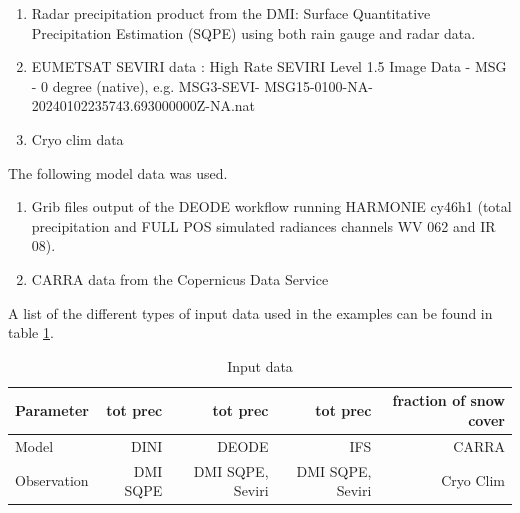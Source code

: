 \documentclass[11pt,a4paper]{article}
\begin{document}
\begin{enumerate}
\item Radar precipitation product from the DMI: Surface Quantitative Precipitation
Estimation (SQPE) using both rain gauge and radar data.

\item EUMETSAT SEVIRI data \cite{seviri}: High Rate SEVIRI
Level 1.5 Image Data - MSG - 0 degree (native), e.g. MSG3-SEVI-
MSG15-0100-NA-20240102235743.693000000Z-NA.nat
\item Cryo clim data
\end{enumerate}

The following model data was used.
\begin{enumerate}
\item Grib files output of the DEODE workflow running HARMONIE cy46h1 (total
precipitation and FULL POS simulated radiances channels WV 062 and IR 08).
\item CARRA data from the Copernicus Data Service

\end{enumerate}




A list of the different types of input data used in the examples can be found in table \ref{tab:grib}. %

\begin{table}
{\center\it\caption{ \label{tab:grib} Input data}}
\begin{center}
\begin{tabular}{|l|r|r|r|r|} \hline
 Parameter    &   tot prec & tot prec & tot prec & fraction of snow cover \\ \hline
 Model                                       & DINI & DEODE &IFS &CARRA \\ \hline
 Observation                                 & DMI SQPE & DMI SQPE, Seviri & DMI SQPE, Seviri & Cryo Clim \\ \hline
\end{tabular}
\end{center}
\end{table} 
\end{document}
